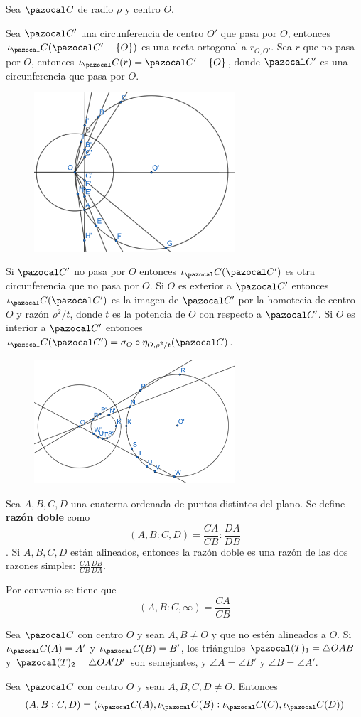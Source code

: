  Sea $\C$ de radio $\rho$ y centro $O$.
\begin{itemizex}
	\item Sea $\C'$ una circunferencia de centro $O'$ que pasa por $O$, entonces $\iota_\C(\C'-\{O\})$ es una recta ortogonal a $r_{O,O'}$. Sea $r$ que no pasa por $O$, entonces $\iota_\C(r) = \C'-\{O\}$, donde $\C'$ es una circunferencia que pasa por $O$.
	\begin{figure}[H]
		\centering
		\includegraphics[width=7.5cm]{figuras/8-18-1.png}
		\vspace{-1em}
	\end{figure}
	\item Si $\C'$ no pasa por $O$ entonces $\iota_\C(\C')$ es otra circunferencia que no pasa por $O$. Si $O$ es exterior a $\C'$ entonces $\iota_\C(\C')$ es la imagen de $\C'$ por la homotecia de centro $O$ y razón $\rho^2/t$, donde $t$ es la potencia de $O$ con respecto a $\C'$. Si $O$ es interior a $\C'$ entonces $\iota_\C(\C') = \sigma_O \circ \eta_{O,\rho^2/t}(\C)$.
	\begin{figure}[H]
		\centering
		\includegraphics[width=7.5cm]{figuras/8-18-2.png}
		\vspace{-1em}
	\end{figure}
\end{itemizex}
 
 Sea $A,B,C,D$ una cuaterna ordenada de puntos distintos del plano. Se define \textbf{razón doble} como 
$$(A,B:C,D) = \frac{CA}{CB}:\frac{DA}{DB}$$. 
Si $A,B,C,D$ están alineados, entonces la razón doble es una razón de las dos razones simples: $\frac{CA}{CB}\frac{DB}{DA}$.

Por convenio se tiene que 
$$(A,B:C,\infty) = \frac{CA}{CB}$$


 Sea $\C$ con centro $O$ y sean $A,B \neq O$ 
y que no estén alineados a $O$. Si $\iota_\C(A)=A'$ y $\iota_\C(B) = B'$, los triángulos $\pazocal(T)_1 = \triangle OAB$ y $\pazocal (T)_2 = \triangle OA'B'$ son semejantes, y $\angle A = \angle B'$ y $\angle B = \angle A'$.

 Sea $\C$ con centro $O$ y sean $A, B, C, D\neq O$. Entonces
$$(A,B:C,D) = (\iota_\C(A), \iota_\C(B):\iota_\C(C),\iota_\C(D))$$

